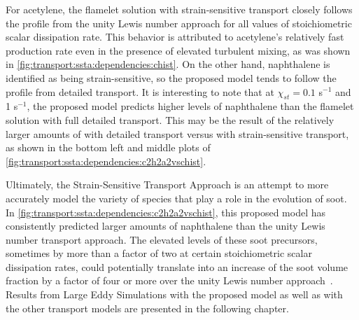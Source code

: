 For acetylene, the flamelet solution with strain-sensitive transport closely follows the profile from the unity Lewis number approach for all values of stoichiometric scalar dissipation rate. This behavior is attributed to acetylene's relatively fast production rate even in the presence of elevated turbulent mixing, as was shown in \cref{fig:transport:ssta:dependencies:chist}. On the other hand, naphthalene is identified as being strain-sensitive, so the proposed model tends to follow the profile from detailed transport. It is interesting to note that at $\chi_{st} = 0.1$ s$^{-1}$ and 1 s$^{-1}$, the proposed model predicts higher levels of naphthalene than the flamelet solution with full detailed transport. This may be the result of the relatively larger amounts of  with detailed transport versus with strain-sensitive transport, as shown in the bottom left and middle plots of \cref{fig:transport:ssta:dependencies:c2h2a2vschist}.

Ultimately, the Strain-Sensitive Transport Approach is an attempt to more accurately model the variety of species that play a role in the evolution of soot. In \cref{fig:transport:ssta:dependencies:c2h2a2vschist}, this proposed model has consistently predicted larger amounts of naphthalene than the unity Lewis number transport approach. The elevated levels of these soot precursors, sometimes by more than a factor of two at certain stoichiometric scalar dissipation rates, could potentially translate into an increase of the soot volume fraction by a factor of four or more over the unity Lewis number approach~\cite{hmom2009}. Results from Large Eddy Simulations with the proposed model as well as with the other transport models are presented in the following chapter.
